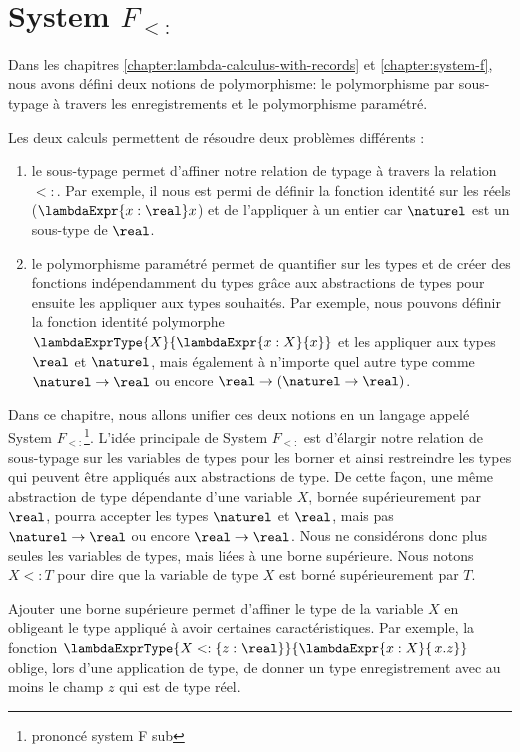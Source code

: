 \chapter{System $F_{<:}$}
\label{chapter:system-f-sub}

Dans les chapitres \ref{chapter:lambda-calculus-with-records} et
\ref{chapter:system-f}, nous avons défini deux notions de polymorphisme: le
polymorphisme par sous-typage à travers les enregistrements et le polymorphisme
paramétré.

Les deux calculs permettent de résoudre deux problèmes différents :
\begin{enumerate}
  \item le sous-typage permet d'affiner notre relation de typage à travers la
    relation $<:$. Par exemple, il nous est permi de définir la fonction
    identité sur les réels ($\lambdaExpr{x : \real} x$) et de l'appliquer à un
    entier car $\naturel$ est un sous-type de $\real$.
  \item le polymorphisme paramétré permet de quantifier sur les types et de
    créer des fonctions indépendamment du types grâce aux abstractions de types
    pour ensuite les appliquer aux types souhaités. Par exemple, nous pouvons
    définir la fonction identité polymorphe $\lambdaExprType{X}{\lambdaExpr{x :
    X}{x}}$ et les appliquer aux types $\real$ et $\naturel$, mais également à
    n'importe quel autre type comme $\naturel \rightarrow \real$ ou encore $\real
    \rightarrow (\naturel \rightarrow \real)$.
\end{enumerate}

Dans ce chapitre, nous allons unifier ces deux notions en un langage appelé
System $F_{<:}$\footnote{prononcé \og system F sub \fg}. L'idée principale de
System $F_{<:}$ est d'élargir notre relation de sous-typage sur les variables de
types pour les borner et ainsi restreindre les types qui peuvent être appliqués
aux abstractions de type. De cette façon, une même abstraction de type dépendante d'une
variable $X$, bornée supérieurement par $\real$, pourra accepter les types $\naturel$ et
$\real$, mais pas $\naturel \rightarrow \real$ ou encore $\real \rightarrow
\real$. Nous ne considérons donc plus seules les variables de types, mais liées
à une borne supérieure. Nous notons $X <: T$ pour dire que la variable de type
$X$ est borné supérieurement par $T$.  

Ajouter une borne supérieure permet d'affiner le type de la variable $X$ en
obligeant le type appliqué à avoir certaines caractéristiques. Par exemple, la
fonction $\lambdaExprType{X <: \left\{ z : \real \right\}}{\lambdaExpr{x :
    X}{\, x.z}}$ oblige, lors d'une application de type, de donner un type
enregistrement avec au moins le champ $z$ qui est de type réel.

